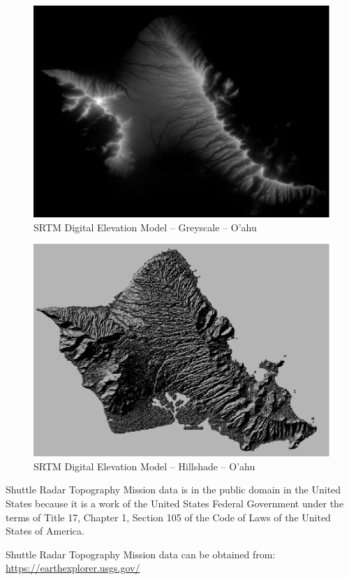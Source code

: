 \begin{figure}
  \centering
  \includegraphics[width=120mm]{images/srtm_oahu.eps}
  \caption{SRTM Digital Elevation Model -- Greyscale -- O'ahu}
\end{figure}

\begin{figure}
  \centering
  \includegraphics[width=120mm]{images/srtm_oahu_shaded.eps}
  \caption{SRTM Digital Elevation Model -- Hillshade -- O'ahu}
\end{figure}

Shuttle Radar Topography Mission data is in the public domain in the United States because it is a work of the United States Federal Government under the terms of Title 17, Chapter 1, Section 105 of the Code of Laws of the United States of America.

Shuttle Radar Topography Mission data can be obtained from:  \cite{Terrain-EarthExplorer} \\
\url{https://earthexplorer.usgs.gov/}

